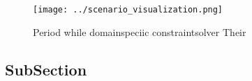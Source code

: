 \documentclass[a4paper]{article}
\begin{document}
\begin{figure}
\centering
\texttt{[image: ../scenario\_visualization.png]}
\caption{Period while domainspeciic constraintsolver Their
}
\end{figure}
 
\subsection{SubSection}
\end{document}
